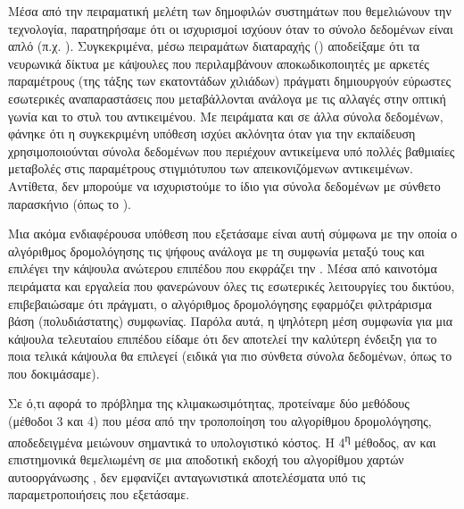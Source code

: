 Μέσα από την πειραματική μελέτη των δημοφιλών συστημάτων που θεμελιώνουν την τεχνολογία, παρατηρήσαμε ότι οι ισχυρισμοί ισχύουν όταν το σύνολο δεδομένων είναι απλό (π.χ. ). Συγκεκριμένα, μέσω πειραμάτων διαταραχής () αποδείξαμε ότι τα νευρωνικά δίκτυα με κάψουλες που περιλαμβάνουν αποκωδικοποιητές με αρκετές παραμέτρους (της τάξης των εκατοντάδων χιλιάδων) πράγματι δημιουργούν εύρωστες εσωτερικές αναπαραστάσεις που μεταβάλλονται ανάλογα με τις αλλαγές στην οπτική γωνία και το στυλ του αντικειμένου. Με πειράματα και σε άλλα σύνολα δεδομένων, φάνηκε ότι η συγκεκριμένη υπόθεση ισχύει ακλόνητα όταν για την εκπαίδευση χρησιμοποιούνται σύνολα δεδομένων που περιέχουν αντικείμενα υπό πολλές βαθμιαίες μεταβολές στις  παραμέτρους στιγμιότυπου των απεικονιζόμενων αντικειμένων. Αντίθετα, δεν μπορούμε να ισχυριστούμε το ίδιο για σύνολα δεδομένων με σύνθετο παρασκήνιο (όπως το ).\par

Μια ακόμα ενδιαφέρουσα υπόθεση που εξετάσαμε είναι αυτή σύμφωνα με την οποία ο αλγόριθμος δρομολόγησης  τις ψήφους ανάλογα με τη συμφωνία μεταξύ τους και επιλέγει την κάψουλα ανώτερου επιπέδου που εκφράζει την . Μέσα από καινοτόμα πειράματα και εργαλεία που φανερώνουν όλες τις εσωτερικές  λειτουργίες του δικτύου, επιβεβαιώσαμε  ότι πράγματι, ο αλγόριθμος δρομολόγησης εφαρμόζει φιλτράρισμα βάση (πολυδιάστατης) συμφωνίας. Παρόλα αυτά, η ψηλότερη μέση συμφωνία για μια κάψουλα τελευταίου επιπέδου είδαμε ότι δεν αποτελεί την καλύτερη ένδειξη για το ποια τελικά κάψουλα θα επιλεγεί (ειδικά για πιο σύνθετα σύνολα δεδομένων, όπως το  που δοκιμάσαμε).

Σε ό,τι αφορά το πρόβλημα της κλιμακωσιμότητας, προτείναμε δύο μεθόδους (μέθοδοι 3 και 4) που μέσα από την τροποποίηση του αλγορίθμου δρομολόγησης, αποδεδειγμένα μειώνουν σημαντικά το υπολογιστικό κόστος. Η 4\textsuperscript{η} μέθοδος, αν και επιστημονικά θεμελιωμένη σε μια αποδοτική εκδοχή του αλγορίθμου χαρτών αυτο\textendash οργάνωσης , δεν εμφανίζει ανταγωνιστικά αποτελέσματα υπό τις παραμετροποιήσεις που εξετάσαμε.\par

